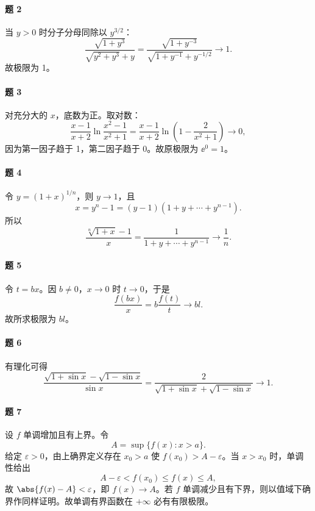 \paragraph{题 2}
\begin{xsolution}
当 $y>0$ 时分子分母同除以 $y^{3/2}$：
\[
  \frac{\sqrt{1+y^3}}{\sqrt{y^2+y^3}+y}
  =\frac{\sqrt{1+y^{-3}}}{\sqrt{1+y^{-1}}+y^{-1/2}}\to1.
\]
故极限为 1。
\end{xsolution}

\paragraph{题 3}
\begin{xsolution}
对充分大的 $x$，底数为正。取对数：
\[
  \frac{x-1}{x+2}\ln\frac{x^2-1}{x^2+1}
  =\frac{x-1}{x+2}\ln\left(1-\frac2{x^2+1}\right)\to0,
\]
因为第一因子趋于 1，第二因子趋于 0。故原极限为 $\ee^0=1$。
\end{xsolution}

\paragraph{题 4}
\begin{xsolution}
令 $y=(1+x)^{1/n}$，则 $y\to1$，且
\[
  x=y^n-1=(y-1)(1+y+\cdots+y^{n-1}).
\]
所以
\[
  \frac{\sqrt[n]{1+x}-1}{x}
  =\frac1{1+y+\cdots+y^{n-1}}\to\frac1n.
\]
\end{xsolution}

\paragraph{题 5}
\begin{xsolution}
令 $t=bx$。因 $b\ne0$，$x\to0$ 时 $t\to0$，于是
\[
  \frac{f(bx)}x=b\frac{f(t)}t\to bl.
\]
故所求极限为 $bl$。
\end{xsolution}

\paragraph{题 6}
\begin{xsolution}
有理化可得
\[
  \frac{\sqrt{1+\sin x}-\sqrt{1-\sin x}}{\sin x}
  =\frac2{\sqrt{1+\sin x}+\sqrt{1-\sin x}}\to1.
\]
\end{xsolution}

\paragraph{题 7}
\begin{xsolution}
设 $f$ 单调增加且有上界。令
\[
  A=\sup\{f(x):x>a\}.
\]
给定 $\varepsilon>0$，由上确界定义存在 $x_0>a$ 使 $f(x_0)>A-\varepsilon$。当 $x>x_0$ 时，单调性给出
\[
  A-\varepsilon<f(x_0)\leq f(x)\leq A,
\]
故 $\abs{f(x)-A}<\varepsilon$，即 $f(x)\to A$。若 $f$ 单调减少且有下界，则以值域下确界作同样证明。故单调有界函数在 $+\infty$ 必有有限极限。
\end{xsolution}

